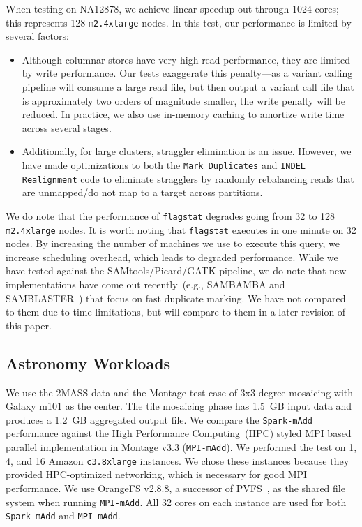 \documentclass{acm_proc_article-sp}
\begin{document}
When testing on NA12878, we achieve linear speedup out through 1024 cores; this represents 128
\texttt{m2.4xlarge} nodes. In this test, our performance is limited by several factors:

\begin{itemize}
\item Although columnar stores have very high read performance, they are limited by write performance. Our
tests exaggerate this penalty---as a variant calling pipeline will consume a large read file, but then output a
variant call file that is approximately two orders of magnitude smaller, the write penalty will be reduced. In
practice, we also use in-memory caching to amortize write time across several stages.
\item Additionally, for large clusters, straggler elimination is an issue. However, we have made optimizations to
both the \texttt{Mark Duplicates} and \texttt{INDEL Realignment} code to eliminate stragglers by randomly
rebalancing reads that are unmapped/do not map to a target across partitions.
\end{itemize}

We do note that the performance of \texttt{flagstat} degrades going from 32 to 128 \texttt{m2.4xlarge} nodes.
It is worth noting that \texttt{flagstat} executes in one minute on 32 nodes. By increasing the number of machines
we use to execute this query, we increase scheduling overhead, which leads to degraded performance. While we
have tested against the SAMtools/Picard/GATK pipeline, we do note that new implementations have come out
recently~(e.g., SAMBAMBA and SAMBLASTER~\cite{faust14}) that focus on fast duplicate marking. We have not
compared to them due to time limitations, but will compare to them in a later revision of this paper.

\subsection{Astronomy Workloads}
\label{sec:astro-workloads}

We use the 2MASS data and the Montage test case of 3x3 degree mosaicing with Galaxy m101 as the
center. The tile mosaicing phase has 1.5~GB input data and produces a 1.2~GB aggregated output file.
We compare the \texttt{Spark-mAdd} performance against the High Performance Computing~(HPC)
styled MPI based parallel implementation in Montage v3.3 (\texttt{MPI-mAdd}). We performed the test on
1, 4, and 16 Amazon \texttt{c3.8xlarge} instances. We chose these instances because they provided
HPC-optimized networking, which is necessary for good MPI performance. We use OrangeFS
v2.8.8, a successor of PVFS~\cite{PVFS}, as the shared file system when running \texttt{MPI-mAdd}. All
32 cores on each instance are used for both \texttt{Spark-mAdd} and \texttt{MPI-mAdd}.
\end{document}
